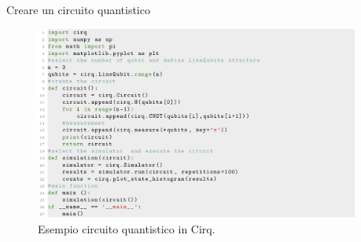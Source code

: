 \documentclass{beamer}
\renewcommand{\'}[0]{\`}
\begin{document}
	\begin{frame}{Creare un circuito quantistico}

	\begin{figure} \includegraphics[width=0.95\textwidth]{./image/Circuito.png} \caption{Esempio circuito quantistico in Cirq. } \end{figure}
	
	\end{frame}
	
\end{document}
